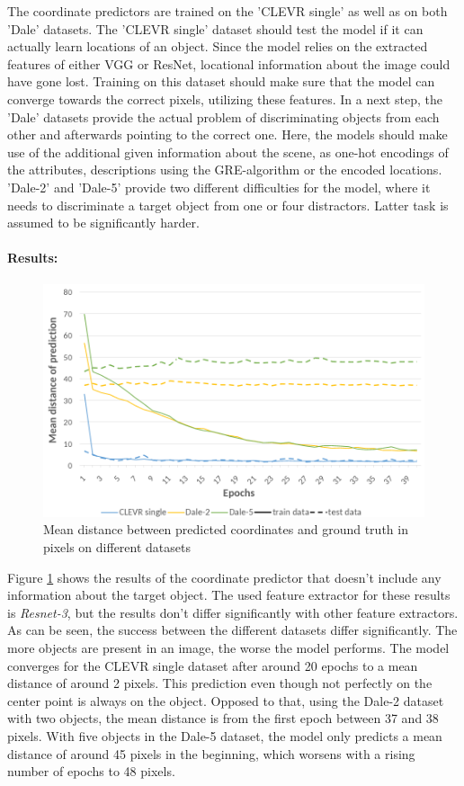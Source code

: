 The coordinate predictors are trained on the 'CLEVR single' as well as on both 'Dale' datasets.
The 'CLEVR single' dataset should test the model if it can actually learn locations of an object.
Since the model relies on the extracted features of either VGG or ResNet, locational information about the image could have gone lost.
Training on this dataset should make sure that the model can converge towards the correct pixels, utilizing these features.
In a next step, the 'Dale' datasets provide the actual problem of discriminating objects from each other and afterwards pointing to the correct one.
Here, the models should make use of the additional given information about the scene, as one-hot encodings of the attributes, descriptions using the GRE-algorithm or the encoded locations.
'Dale-2' and 'Dale-5' provide two different difficulties for the model, where it needs to discriminate a target object from one or four distractors.
Latter task is assumed to be significantly harder.

\paragraph*{Results:}

\begin{figure}[h]
    \centering
    \includegraphics[width=0.8\linewidth]{figures/coordinate-predictor_loss.png}
    \caption{Mean distance between predicted coordinates and ground truth in pixels on different datasets}
    \label{fig:coordinate-predictor_loss}
\end{figure}

Figure \ref{fig:coordinate-predictor_loss} shows the results of the coordinate predictor that doesn't include any information about the target object.
The used feature extractor for these results is \emph{Resnet-3}, but the results don't differ significantly with other feature extractors.
As can be seen, the success between the different datasets differ significantly.
The more objects are present in an image, the worse the model performs.
The model converges for the CLEVR single dataset after around 20 epochs to a mean distance of around 2 pixels.
This prediction even though not perfectly on the center point is always on the object.
Opposed to that, using the Dale-2 dataset with two objects, the mean distance is from the first epoch between 37 and 38 pixels.
With five objects in the Dale-5 dataset, the model only predicts a mean distance of around 45 pixels in the beginning, which worsens with a rising number of epochs to 48 pixels.

